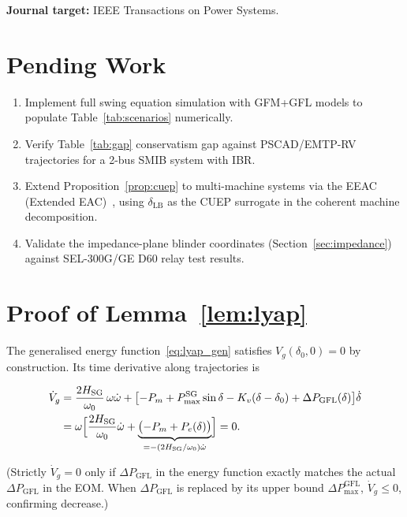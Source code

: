 \documentclass[11pt,a4paper]{article}
\newcommand{\dz}{\delta_0}         %
\newcommand{\dlb}{\delta_{\mathrm{LB}}}   %
\newcommand{\Pm}{P_m}
\newcommand{\PmaxSG}{P_{\max}^{\mathrm{SG}}}
\newcommand{\Kv}{K_v}
\newcommand{\Hsg}{H_{\mathrm{SG}}}
\newcommand{\omegaz}{\omega_0}
\begin{document}
\textbf{Journal target:} IEEE Transactions on Power Systems.

\section{Pending Work}
\label{sec:pending}

\begin{enumerate}
  \item Implement full swing equation simulation with GFM+GFL models to
        populate Table~\ref{tab:scenarios} numerically.
  \item Verify Table~\ref{tab:gap} conservatism gap against PSCAD/EMTP-RV
        trajectories for a 2-bus SMIB system with IBR.
  \item Extend Proposition~\ref{prop:cuep} to multi-machine systems via the
        EEAC (Extended EAC)~\cite{Chiang1987}, using $\dlb$ as the CUEP
        surrogate in the coherent machine decomposition.
  \item Validate the impedance-plane blinder coordinates (Section~\ref{sec:impedance})
        against SEL-300G/GE D60 relay test results.
\end{enumerate}

\appendix
\section{Proof of Lemma~\ref{lem:lyap}}
\label{app:proof}

The generalised energy function~\eqref{eq:lyap_gen} satisfies
$V_g(\dz, 0) = 0$ by construction.
Its time derivative along trajectories is

\begin{align*}
  \dot{V}_g &= \frac{2\Hsg}{\omegaz}\,\omega\dot\omega
    + \bigl[-\Pm + \PmaxSG\sin\delta - \Kv(\delta-\dz)
      + \Delta P_{\mathrm{GFL}}(\delta)\bigr]\dot\delta \\
  &= \omega\Bigl[\frac{2\Hsg}{\omegaz}\dot\omega
    + \underbrace{\bigl(-\Pm + P_e(\delta)\bigr)}_{= -(2\Hsg/\omegaz)\dot\omega}\Bigr]
  = 0.
\end{align*}

(Strictly $\dot V_g = 0$ only if $\Delta P_\mathrm{GFL}$ in the energy
function exactly matches the actual $\Delta P_\mathrm{GFL}$ in the EOM.
When $\Delta P_\mathrm{GFL}$ is replaced by its upper bound
$\Delta P_{\max}^\mathrm{GFL}$, $\dot V_g \leq 0$, confirming decrease.)
\end{document}
